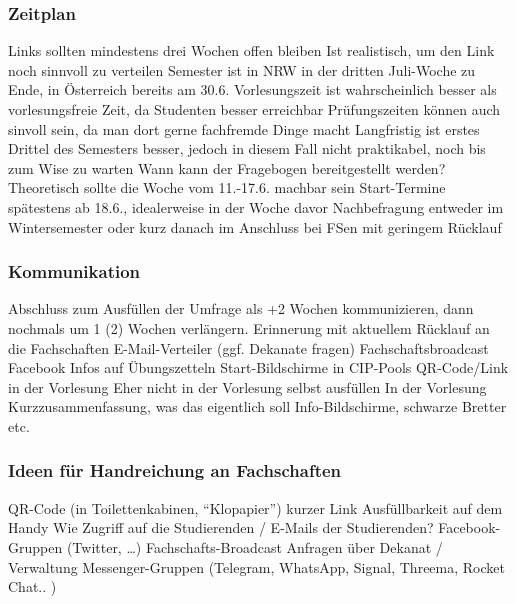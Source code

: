 \begin{outline}
      \subsubsection*{Zeitplan}
        \begin{outline}
          \1 Links sollten mindestens drei Wochen offen bleiben
          \1 Ist realistisch, um den Link noch sinnvoll zu verteilen
          \1 Semester ist in NRW in der dritten Juli-Woche zu Ende, in Österreich bereits am 30.6.
          \1 Vorlesungszeit ist wahrscheinlich besser als vorlesungsfreie Zeit, da Studenten besser erreichbar
          \1 Prüfungszeiten können auch sinvoll sein, da man dort gerne fachfremde Dinge macht
          \1 Langfristig ist erstes Drittel des Semesters besser, jedoch in diesem Fall nicht praktikabel, noch bis zum Wise zu warten
          \1 Wann kann der Fragebogen bereitgestellt werden?
            \2 Theoretisch sollte die Woche vom 11.-17.6. machbar sein
          \1 Start-Termine
            \2 spätestens ab 18.6., idealerweise in der Woche davor
          \1 Nachbefragung entweder im Wintersemester oder kurz danach im Anschluss bei FSen mit geringem Rücklauf
        \end{outline}

      \subsubsection*{Kommunikation}
        \begin{outline}
          \1 Abschluss zum Ausfüllen der Umfrage als +2 Wochen kommunizieren, dann nochmals um 1 (2) Wochen verlängern.
          \1 Erinnerung mit aktuellem Rücklauf an die Fachschaften
          \1 E-Mail-Verteiler (ggf. Dekanate fragen)
          \1 Fachschaftsbroadcast
          \1 Facebook
          \1 Infos auf Übungszetteln
          \1 Start-Bildschirme in CIP-Pools
          \1 QR-Code/Link in der Vorlesung
            \2 Eher nicht in der Vorlesung selbst ausfüllen
            \2 In der Vorlesung Kurzzusammenfassung, was das eigentlich soll
          \1 Info-Bildschirme, schwarze Bretter etc.

        \end{outline}

      \subsubsection*{Ideen für Handreichung an Fachschaften}
        \begin{outlne}
          \1 QR-Code (in Toilettenkabinen, “Klopapier”)
          \1 kurzer Link
          \1 Ausfüllbarkeit auf dem Handy
          \1 Wie Zugriff auf die Studierenden / E-Mails der Studierenden?
            \2 Facebook-Gruppen (Twitter, …)
            \2 Fachschafts-Broadcast
            \2 Anfragen über Dekanat / Verwaltung
            \2 Messenger-Gruppen (Telegram, WhatsApp, Signal, Threema, Rocket Chat.. )
        \end{outlne}


\end{outline}
